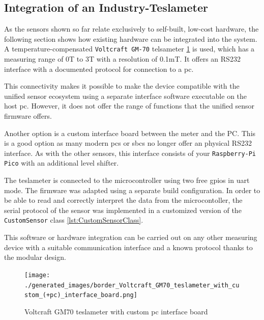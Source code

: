 \hypertarget{integration-of-an-industry-teslameter}{%
\subsection{Integration of an
Industry-Teslameter}\label{integration-of-an-industry-teslameter}}

As the sensors shown so far relate exclusively to self-built, low-cost
hardware, the following section shows how existing hardware can be
integrated into the system. A temperature-compensated
\passthrough{\lstinline!Voltcraft GM-70!} telsameter
\ref{Voltcraft_GM70_teslameter_with_custom_(+pc)_interface_board.png} is
used, which has a measuring range of 0T to 3T with a resolution of
0.1mT. It offers an RS232 interface with a documented protocol for
connection to a \gls{pc}.

This connectivity makes it possible to make the device compatible with
the unified sensor ecosystem using a separate interface software
\cite{VoltcraftGM70Rest} executable on the host \gls{pc}. However,
it does not offer the range of functions that the unified sensor
firmware offers.

Another option is a custom interface board between the meter and the PC.
This is a good option as many modern \gls{pc}s or \gls{sbc}s no longer
offer an physical RS232 interface. As with the other sensors, this
interface consists of your \passthrough{\lstinline!Raspberry-Pi Pico!}
with an additional level shifter.

The teslameter is connected to the microcontroller using two free
\gls{gpio}s in \gls{uart} mode. The firmware was adapted using a
separate build configuration. In order to be able to read and correctly
interpret the data from the microcontoller, the serial protocol of the
sensor was implemented in a customized version of the
\passthrough{\lstinline!CustomSensor!} class
\ref{lst:CustomSensorClass}.

This software or hardware integration can be carried out on any other
measuring device with a suitable communication interface and a known
protocol thanks to the modular design.

\begin{figure}
\centering
\texttt{[image: ./generated\_images/border\_Voltcraft\_GM70\_teslameter\_with\_custom\_(+pc)\_interface\_board.png]}
\caption{Voltcraft GM70 teslameter with custom \gls{pc} interface board
\label{Voltcraft_GM70_teslameter_with_custom_(+pc)_interface_board.png}}
\end{figure}

